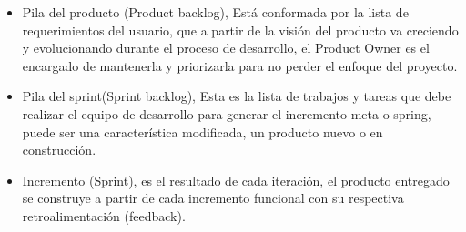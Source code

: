 \begin{itemize}
    \item Pila del producto (Product backlog), Está conformada por la lista de requerimientos del usuario, que a partir de la visión del producto va creciendo y evolucionando durante el proceso de desarrollo, el Product Owner es el encargado de mantenerla y priorizarla para no perder el enfoque del proyecto.
    \item Pila del sprint(Sprint backlog), Esta es la lista de trabajos y tareas que debe realizar el equipo de desarrollo para generar el incremento meta o spring, puede ser una característica modificada, un producto nuevo o en construcción.
    \item Incremento (Sprint), es el resultado de cada iteración, el producto entregado se construye a partir de cada incremento funcional con su respectiva retroalimentación (feedback).
\end{itemize}

